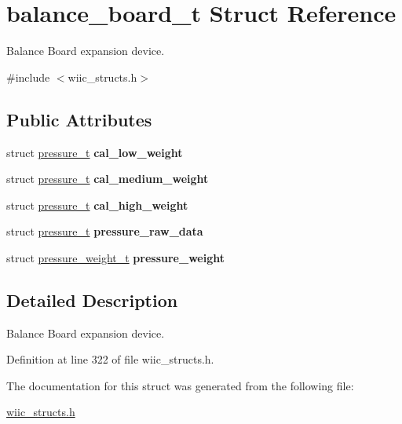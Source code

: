 \hypertarget{structbalance__board__t}{\section{balance\-\_\-board\-\_\-t \-Struct \-Reference}
\label{structbalance__board__t}
}


\-Balance \-Board expansion device.  




{\ttfamily \#include $<$wiic\-\_\-structs.\-h$>$}

\subsection*{\-Public \-Attributes}
\begin{DoxyCompactItemize}
\item 
\hypertarget{structbalance__board__t_a0ba9ccde483558b820c8062757864bad}{struct \hyperlink{structpressure__t}{pressure\-\_\-t} {\bfseries cal\-\_\-low\-\_\-weight}}\label{structbalance__board__t_a0ba9ccde483558b820c8062757864bad}

\item 
\hypertarget{structbalance__board__t_a04836ca22dad56206232b1b7836ff023}{struct \hyperlink{structpressure__t}{pressure\-\_\-t} {\bfseries cal\-\_\-medium\-\_\-weight}}\label{structbalance__board__t_a04836ca22dad56206232b1b7836ff023}

\item 
\hypertarget{structbalance__board__t_a9efb8f44640fa6ef0b459322335fad93}{struct \hyperlink{structpressure__t}{pressure\-\_\-t} {\bfseries cal\-\_\-high\-\_\-weight}}\label{structbalance__board__t_a9efb8f44640fa6ef0b459322335fad93}

\item 
\hypertarget{structbalance__board__t_a758120272d9ea7e0257ff8106d746e70}{struct \hyperlink{structpressure__t}{pressure\-\_\-t} {\bfseries pressure\-\_\-raw\-\_\-data}}\label{structbalance__board__t_a758120272d9ea7e0257ff8106d746e70}

\item 
\hypertarget{structbalance__board__t_af1fc954c03bb9c1aec63c57d732c7e0e}{struct \hyperlink{structpressure__weight__t}{pressure\-\_\-weight\-\_\-t} {\bfseries pressure\-\_\-weight}}\label{structbalance__board__t_af1fc954c03bb9c1aec63c57d732c7e0e}

\end{DoxyCompactItemize}


\subsection{\-Detailed \-Description}
\-Balance \-Board expansion device. 

\-Definition at line 322 of file wiic\-\_\-structs.\-h.



\-The documentation for this struct was generated from the following file\-:\begin{DoxyCompactItemize}
\item 
\hyperlink{wiic__structs_8h}{wiic\-\_\-structs.\-h}\end{DoxyCompactItemize}
